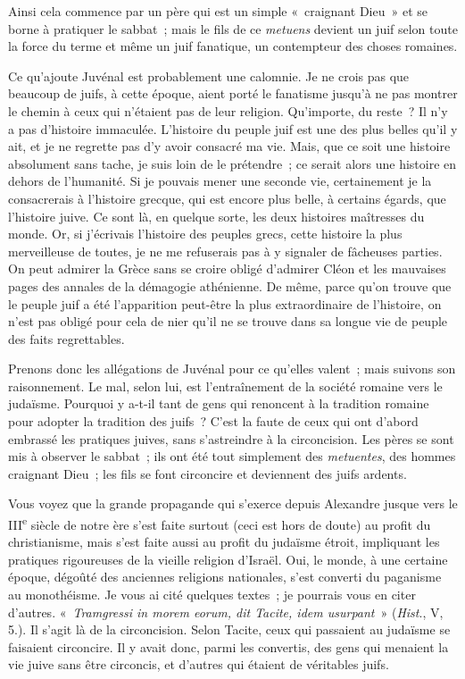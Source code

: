 \documentclass[french,twoside]{book} %
\newcommand\orgName[1]{#1}
\newcommand\persName[1]{#1}
\begin{document}
\noindent Ainsi cela commence par un père qui est un simple « craignant {\persName Dieu} » et se borne à pratiquer le sabbat ; mais le fils de ce {\itshape metuens} devient un juif selon toute la force du terme et même un juif fanatique, un contempteur des choses romaines.\par
Ce qu’ajoute {\persName Juvénal} est probablement une calomnie. Je ne crois pas que beaucoup de juifs, à cette époque, aient porté le fanatisme jusqu’à ne pas montrer le chemin à ceux qui n’étaient pas de leur religion. Qu’importe, du reste ? Il n’y a pas d’histoire immaculée. L’histoire du peuple juif est une des plus belles qu’il y ait, et je ne regrette pas d’y avoir consacré ma vie. Mais, que ce soit une histoire absolument sans tache, je suis loin de le prétendre ; ce serait alors une histoire en dehors de l’humanité. Si je pouvais mener une seconde vie, certainement je la consacrerais à l’histoire grecque, qui est encore plus belle, à certains égards, que l’histoire juive. Ce sont là, en quelque sorte, les deux histoires maîtresses du monde. Or, si j’écrivais l’histoire des {\orgName peuples grecs}, cette histoire la plus merveilleuse de toutes, je ne me refuserais pas à y signaler de fâcheuses parties. On peut admirer la {\orgName Grèce} sans se croire obligé d’admirer {\persName Cléon} et les mauvaises pages des annales de la démagogie athénienne. De même, parce qu’on trouve que le {\orgName peuple juif} a été l’apparition peut-être la plus extraordinaire de l’histoire, on n’est pas obligé pour cela de nier qu’il ne se trouve dans sa longue vie de peuple des faits regrettables.\par
Prenons donc les allégations de {\persName Juvénal} pour ce qu’elles valent ; mais suivons son raisonnement. Le mal, selon lui, est l’entraînement de la société romaine vers le judaïsme. Pourquoi y a-t-il tant de gens qui renoncent à la tradition romaine pour adopter la tradition des juifs ? C’est la faute de ceux qui ont d’abord embrassé les pratiques juives, sans s’astreindre à la circoncision. Les pères se sont mis à observer le sabbat ; ils ont été tout simplement des {\itshape metuentes}, des hommes craignant {\persName Dieu} ; les fils se font circoncire et deviennent des juifs ardents.\par
Vous voyez que la grande propagande qui s’exerce depuis {\persName Alexandre} jusque vers le III\textsuperscript{e} siècle de notre ère s’est faite surtout (ceci est hors de doute) au profit du christianisme, mais s’est faite aussi au profit du judaïsme étroit, impliquant les pratiques rigoureuses de la vieille religion d’{\orgName Israël}. Oui, le monde, à une certaine époque, dégoûté des anciennes religions nationales, s’est converti du paganisme au monothéisme. Je vous ai cité quelques textes ; je pourrais vous en citer d’autres. « \emph{Tramgressi in morem eorum, dit {\persName Tacite}, idem usurpant} » (\emph{Hist}., V, 5.). Il s’agit là de la circoncision. Selon {\persName Tacite}, ceux qui passaient au judaïsme se faisaient circoncire. Il y avait donc, parmi les convertis, des gens qui menaient la vie juive sans être circoncis, et d’autres qui étaient de véritables juifs.\par
\end{document}
